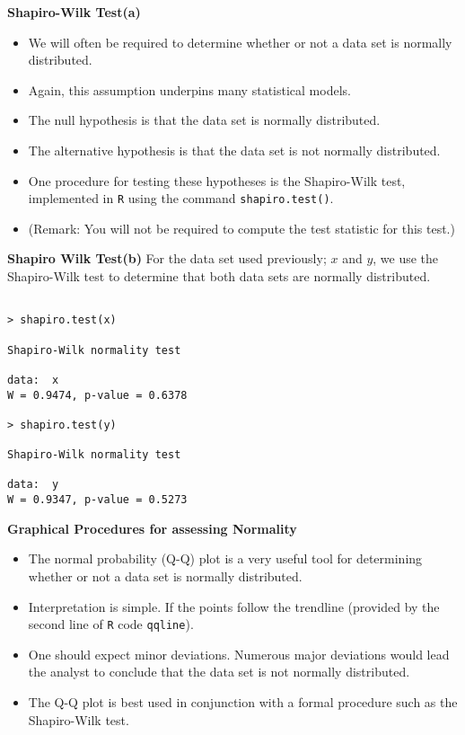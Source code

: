 \documentclass[]{report}
\begin{document}



\textbf{Shapiro-Wilk Test(a)}


\begin{itemize}
	\item We will often be required to determine whether or not a data set is normally distributed.
	\item Again, this assumption underpins many statistical models.
	\item The null hypothesis is that the data set is normally distributed.
	\item The alternative hypothesis is that the data set is not normally distributed.
	\item One procedure for testing these hypotheses is the Shapiro-Wilk test, implemented in \texttt{R} using the command \texttt{shapiro.test()}.
	\item (Remark: You will not be required to compute the test statistic for this test.)
\end{itemize}


\textbf{Shapiro Wilk Test(b)}
For the data set used previously; $x$ and $y$, we use the Shapiro-Wilk test to determine that both data sets are normally distributed.
\begin{verbatim}

> shapiro.test(x)

Shapiro-Wilk normality test

data:  x
W = 0.9474, p-value = 0.6378

> shapiro.test(y)

Shapiro-Wilk normality test

data:  y
W = 0.9347, p-value = 0.5273
\end{verbatim}





\textbf{Graphical Procedures for assessing Normality}

\begin{itemize}
	\item The normal probability (Q-Q) plot is a very useful tool for determining whether or not a data set is normally distributed.
	\item Interpretation is simple. If the points follow the trendline (provided by the second line of \texttt{R} code \texttt{qqline}).
	\item One should expect minor deviations. Numerous major deviations would lead the analyst to conclude that the data set is not normally distributed.
	\item The Q-Q plot is best used in conjunction with a formal procedure such as the Shapiro-Wilk test.
\end{itemize}
\end{document}
